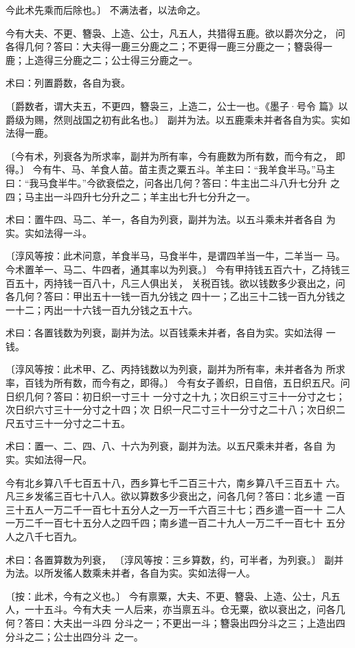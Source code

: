 \documentclass[12pt,UTF8]{ctexbook}
\begin{document}
今此术先乘而后除也。〕 不满法者，以法命之。

今有大夫、不更、簪袅、上造、公士，凡五人，共猎得五鹿。欲以爵次分之， 问各得几何？答曰：大夫得一鹿三分鹿之二；不更得一鹿三分鹿之一；簪袅得一 鹿；上造得三分鹿之二；公士得三分鹿之一。

术曰：列置爵数，各自为衰。

〔爵数者，谓大夫五，不更四，簪袅三，上造二，公士一也。《墨子·号令 篇》以爵级为赐，然则战国之初有此名也。〕 副并为法。以五鹿乘未并者各自为实。实如法得一鹿。

〔今有术，列衰各为所求率，副并为所有率，今有鹿数为所有数，而今有之， 即得。〕 今有牛、马、羊食人苗。苗主责之粟五斗。羊主曰：“我羊食半马。”马主 曰：“我马食半牛。”今欲衰偿之，问各出几何？答曰：牛主出二斗八升七分升 之四；马主出一斗四升七分升之二；羊主出七升七分升之一。

术曰：置牛四、马二、羊一，各自为列衰，副并为法。以五斗乘未并者各自 为实。实如法得一斗。

〔淳风等按：此术问意，羊食半马，马食半牛，是谓四羊当一牛，二羊当一 马。今术置羊一、马二、牛四者，通其率以为列衰。〕 今有甲持钱五百六十，乙持钱三百五十，丙持钱一百八十，凡三人俱出关， 关税百钱。欲以钱数多少衰出之，问各几何？答曰：甲出五十一钱一百九分钱之 四十一；乙出三十二钱一百九分钱之一十二；丙出一十六钱一百九分钱之五十六。

术曰：各置钱数为列衰，副并为法。以百钱乘未并者，各自为实。实如法得 一钱。

〔淳风等按：此术甲、乙、丙持钱数以为列衰，副并为所有率，未并者各为 所求率，百钱为所有数，而今有之，即得。〕 今有女子善织，日自倍，五日织五尺。问日织几何？答曰：初日织一寸三十 一分寸之十九；次日织三寸三十一分寸之七；次日织六寸三十一分寸之十四；次 日织一尺二寸三十一分寸之二十八；次日织二尺五寸三十一分寸之二十五。

术曰：置一、二、四、八、十六为列衰，副并为法。以五尺乘未并者，各自 为实。实如法得一尺。

今有北乡算八千七百五十八，西乡算七千二百三十六，南乡算八千三百五十 六。凡三乡发徭三百七十八人。欲以算数多少衰出之，问各几何？答曰：北乡遣 一百三十五人一万二千一百七十五分人之一万一千六百三十七；西乡遣一百一十 二人一万二千一百七十五分人之四千四；南乡遣一百二十九人一万二千一百七十 五分人之八千七百九。

术曰：各置算数为列衰， 〔淳风等按：三乡算数，约，可半者，为列衰。〕 副并为法。以所发徭人数乘未并者，各自为实。实如法得一人。

〔按：此术，今有之义也。〕 今有禀粟，大夫、不更、簪袅、上造、公士，凡五人，一十五斗。今有大夫 一人后来，亦当禀五斗。仓无粟，欲以衰出之，问各几何？答曰：大夫出一斗四 分斗之一；不更出一斗；簪袅出四分斗之三；上造出四分斗之二；公士出四分斗 之一。
\end{document}
